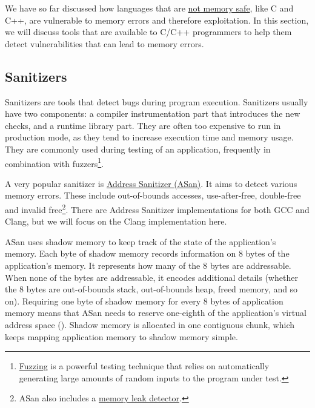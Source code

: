 \documentclass[
  a4paper,
]{report}
\begin{document}
We have so far discussed how languages that are
\hyperref[a-bit-of-background-on-memory-vulnerabilities]{not memory
safe}, like C and C++, are vulnerable to memory errors and therefore
exploitation. In this section, we will discuss tools that are available
to
\label{__index_entry_62}{C}/\label{__index_entry_63}{C++}
programmers to help them detect vulnerabilities that can lead to memory
errors.

\subsection{Sanitizers}\label{sanitizers}

\label{__index_entry_64}{Sanitizers}
are tools that detect bugs during program execution. Sanitizers usually
have two components: a compiler instrumentation part that introduces the
new checks, and a runtime library part. They are often too expensive to
run in production mode, as they tend to increase execution time and
memory usage. They are commonly used during testing of an application,
frequently in combination with
\label{__index_entry_65}{fuzzers}\footnote{\href{https://en.wikipedia.org/wiki/Fuzzing}{\label{__index_entry_66}{Fuzzing}}
  is a powerful testing technique that relies on automatically
  generating large amounts of random inputs to the program under test.}.

A very popular sanitizer is
\href{https://clang.llvm.org/docs/AddressSanitizer.html}{\label{__index_entry_67}{Address
Sanitizer (ASan)}}. It aims to detect
various memory errors. These include out-of-bounds accesses,
use-after-free, double-free and invalid free\footnote{ASan also includes
  a
  \href{https://clang.llvm.org/docs/LeakSanitizer.html}{\label{__index_entry_68}{memory
  leak detector}}.}. There are Address Sanitizer
implementations for both
\label{__index_entry_69}{GCC} and
\label{__index_entry_70}{Clang}, but we will
focus on the Clang implementation here.

ASan uses \label{__index_entry_71}{shadow
memory} to keep track of the state of the
application's memory. Each byte of shadow memory records information on
8 bytes of the application's memory. It represents how many of the 8
bytes are addressable. When none of the bytes are addressable, it
encodes additional details (whether the 8 bytes are out-of-bounds stack,
out-of-bounds heap, freed memory, and so on). Requiring one byte of
shadow memory for every 8 bytes of application memory means that ASan
needs to reserve one-eighth of the application's virtual address space
(). Shadow memory
is allocated in one contiguous chunk, which keeps mapping application
memory to shadow memory simple.
\end{document}
